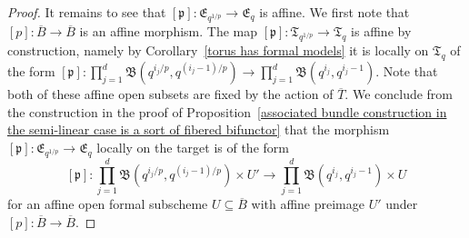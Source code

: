 \documentclass[10pt,oneside]{amsart}
\theoremstyle{definition}
\begin{document}
\begin{proof}
		It remains to see that $[\mathfrak p]:\mathfrak E_{q^{1/p}} \rightarrow  \mathfrak E_{q}$ is affine. We first note that $[p]:\overline{B}\rightarrow \overline{B}$ is an affine morphism. The map $[\mathfrak p]:\mathfrak T_{q^{1/p}}\rightarrow \mathfrak T_{q}$ is affine by construction, namely by Corollary~\ref{torus has formal models} it is locally on $\mathfrak T_{q}$ of the form $[\mathfrak p]:\prod_{j=1}^d \mathfrak B(q^{i_j/p},q^{(i_j-1)/p})\rightarrow \prod_{j=1}^d \mathfrak B(q^{i_j},q^{i_j-1})$. Note that both of these affine open subsets are fixed by the action of $\overline{T}$.
		We conclude from the construction in the proof of Proposition~\ref{associated bundle construction in the semi-linear case is a sort of fibered bifunctor} that the morphism  $[\mathfrak p]:\mathfrak E_{q^{1/p}} \rightarrow  \mathfrak E_{q}$ locally on the target is of the form
		\[[\mathfrak p]:\prod_{j=1}^d \mathfrak B(q^{i_j/p},q^{(i_j-1)/p}) \times U' \rightarrow \prod_{j=1}^d \mathfrak B(q^{i_j},q^{i_j-1}) \times U\]
		for an affine open formal subscheme $U\subseteq \overline{B}$ with affine preimage $U'$ under $[p]:\overline{B}\rightarrow \overline{B}$.
	\end{proof}
	
\end{document}
